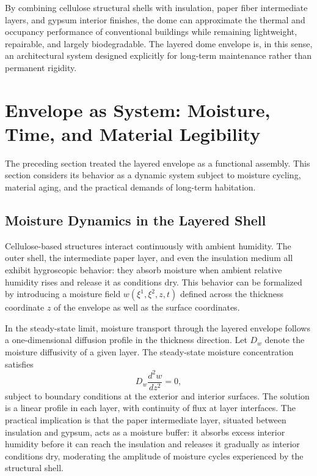 \documentclass[12pt,a4paper]{article}
\begin{document}
By combining cellulose structural shells with insulation, paper fiber
intermediate layers, and gypsum interior finishes, the dome can
approximate the thermal and occupancy performance of conventional
buildings while remaining lightweight, repairable, and largely
biodegradable. The layered dome envelope is, in this sense, an
architectural system designed explicitly for long-term maintenance
rather than permanent rigidity.

\section{Envelope as System: Moisture, Time, and Material Legibility}

The preceding section treated the layered envelope as a functional
assembly. This section considers its behavior as a dynamic system
subject to moisture cycling, material aging, and the practical demands
of long-term habitation.

\subsection{Moisture Dynamics in the Layered Shell}

Cellulose-based structures interact continuously with ambient humidity.
The outer shell, the intermediate paper layer, and even the insulation
medium all exhibit hygroscopic behavior: they absorb moisture when
ambient relative humidity rises and release it as conditions dry. This
behavior can be formalized by introducing a moisture field
$w(\xi^1,\xi^2,z,t)$ defined across the thickness coordinate $z$ of
the envelope as well as the surface coordinates.

In the steady-state limit, moisture transport through the layered
envelope follows a one-dimensional diffusion profile in the thickness
direction. Let $D_w$ denote the moisture diffusivity of a given layer.
The steady-state moisture concentration satisfies
\begin{equation}
D_w \frac{d^2 w}{dz^2} = 0,
\end{equation}
subject to boundary conditions at the exterior and interior surfaces.
The solution is a linear profile in each layer, with continuity of flux
at layer interfaces. The practical implication is that the paper
intermediate layer, situated between insulation and gypsum, acts as a
moisture buffer: it absorbs excess interior humidity before it can reach
the insulation and releases it gradually as interior conditions dry,
moderating the amplitude of moisture cycles experienced by the
structural shell.
\end{document}
